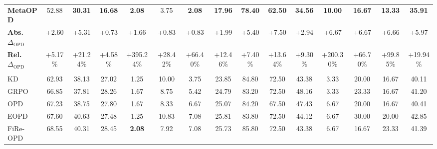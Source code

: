 \documentclass{article}
\theoremstyle{plain}
\theoremstyle{definition}
\theoremstyle{remark}
\begin{document}
\begin{table}[t]
{\begin{tabular}{@{}l*{14}{c}@{}}
\textbf{MetaOPD} & 52.88 & \textbf{30.31} & \textbf{16.68} & \textbf{2.08} & 3.75 & \textbf{2.08} & \textbf{17.96} & \textbf{78.40} & \textbf{62.50} & \textbf{34.56} & \textbf{10.00} & \textbf{16.67} & \textbf{13.33} & \textbf{35.91} \\
\rowcolor{MetaAbsBg}
\textcolor{MetaAbsText}{\bfseries Abs. \(\Delta_{\mathrm{OPD}}\)}
& \textcolor{MetaAbsText}{+2.60} & \textcolor{MetaAbsText}{+5.31} & \textcolor{MetaAbsText}{+0.73} & \textcolor{MetaAbsText}{+1.66} & \textcolor{MetaAbsText}{+0.83} & \textcolor{MetaAbsText}{+0.83} & \textcolor{MetaAbsText}{+1.99}
& \textcolor{MetaAbsText}{+5.40} & \textcolor{MetaAbsText}{+7.50} & \textcolor{MetaAbsText}{+2.94} & \textcolor{MetaAbsText}{+6.67} & \textcolor{MetaAbsText}{+6.67} & \textcolor{MetaAbsText}{+6.66} & \textcolor{MetaAbsText}{+5.97} \\
\rowcolor{MetaRelBg}
\textcolor{MetaRelText}{\bfseries Rel. \(\Delta_{\mathrm{OPD}}\)}
& \textcolor{MetaRelText}{+5.17\%} & \textcolor{MetaRelText}{+21.24\%} & \textcolor{MetaRelText}{+4.58\%} & \textcolor{MetaRelText}{+395.24\%} & \textcolor{MetaRelText}{+28.42\%} & \textcolor{MetaRelText}{+66.40\%} & \textcolor{MetaRelText}{+12.46\%}
& \textcolor{MetaRelText}{+7.40\%} & \textcolor{MetaRelText}{+13.64\%} & \textcolor{MetaRelText}{+9.30\%} & \textcolor{MetaRelText}{+200.30\%} & \textcolor{MetaRelText}{+66.70\%} & \textcolor{MetaRelText}{+99.85\%} & \textcolor{MetaRelText}{+19.94\%} \\
\addlinespace[1.5pt]
\rowcolor{MetaPairBg}
\multicolumn{15}{c}{%
    \textcolor{MetaPairAccent}{\bfseries\textsc{Teacher}}\;\textcolor{MetaPairText}{\bfseries Qwen3-8B}
    \quad\textcolor{MetaPairAccent}{\(\rightsquigarrow\)}\quad
    \textcolor{MetaPairAccent}{\bfseries\textsc{Student}}\;\textcolor{MetaPairText}{\bfseries Qwen3-1.7B-Base}
} \\
\midrule
KD       & 62.93 & 38.13 & 27.02 & 1.25 & 10.00 & 3.75 & 23.85 & 84.80 & 72.50 & 43.38 & 3.33 & 20.00 & 16.67 & 40.11 \\
GRPO     & 66.85 & 37.81 & 28.26 & 1.67 & 8.75 & 5.42 & 24.79 & 83.20 & 72.50 & 48.16 & 3.33 & 23.33 & 16.67 & 41.20 \\
OPD      & 67.23 & 38.75 & 27.80 & 1.67 & 8.33 & 6.67 & 25.07 & 84.20 & 67.50 & 47.43 & 6.67 & 20.00 & 16.67 & 40.41 \\
EOPD     & 67.60 & 40.63 & 27.48 & 1.25 & 10.83 & 7.08 & 25.81 & 83.80 & 72.50 & 44.12 & 6.67 & 30.00 & 20.00 & 42.85 \\
FiRe-OPD & 68.55 & 40.31 & 28.45 & \textbf{2.08} & 7.92 & 7.08 & 25.73 & 85.80 & 72.50 & 43.38 & 6.67 & 16.67 & 23.33 & 41.39 \\

\end{tabular}}
\end{table}
\end{document}
